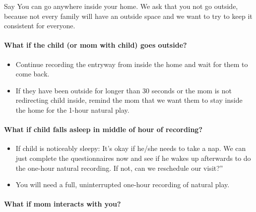 \documentclass[
  12pt,
]{book}
\providecommand{\tightlist}{%
  \setlength{\itemsep}{0pt}\setlength{\parskip}{0pt}}
\begin{document}
Say You can go anywhere inside your home. We ask that you not go outside, because not every family will have an outside space and we want to try to keep it consistent for everyone.

\hypertarget{what-if-the-child-or-mom-with-child-goes-outside}{%
\paragraph*{What if the child (or mom with child) goes outside?}\label{what-if-the-child-or-mom-with-child-goes-outside}}

\begin{itemize}
\tightlist
\item
  Continue recording the entryway from inside the home and wait for them to come back.
\item
  If they have been outside for longer than 30 seconds or the mom is not redirecting child inside, remind the mom that we want them to stay inside the home for the 1-hour natural play.
\end{itemize}

\hypertarget{what-if-child-falls-asleep-in-middle-of-hour-of-recording}{%
\paragraph*{What if child falls asleep in middle of hour of recording?}\label{what-if-child-falls-asleep-in-middle-of-hour-of-recording}}

\begin{itemize}
\tightlist
\item
  If child is noticeably sleepy: It's okay if he/she needs to take a nap. We can just complete the questionnaires now and see if he wakes up afterwards to do the one-hour natural recording. If not, can we reschedule our visit?''
\item
  You will need a full, uninterrupted one-hour recording of natural play.
\end{itemize}

\hypertarget{what-if-mom-interacts-with-you}{%
\paragraph*{What if mom interacts with you?}\label{what-if-mom-interacts-with-you}}
\end{document}
